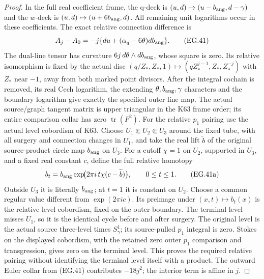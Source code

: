 \begin{proof}
In the full real coefficient frame,
the q-deck is
\((u,d)\mapsto(u-b_{\rm ang},d-\gamma)\)
and the \(w\)-deck is
\((u,d)\mapsto(u+6b_{\rm ang},d)\).
All remaining unit logarithms occur
in these coefficients. The exact
relative connection difference is
\[
 A_j-A_0=-j\{du+(\alpha_q-6\theta)
                                     db_{\rm ang}\}.
 \tag{EG.41}
\]
The dual-line tensor has curvature
\(6j\,d\theta\wedge db_{\rm ang}\),
whose square is zero. Its relative
isomorphism is fixed by the actual
disc
\((q/Z_*,Z_*,1)\mapsto(qZ_*^{j-1},Z_*,Z_*^{-j})\)
with \(Z_*\) near \(-1\), away
from both marked point divisors.
After the integral cochain is
removed, its real Cech logarithm,
the extending \(\theta,b_{\rm ang},
\gamma\) characters and the
boundary logarithm give exactly
the specified outer line map.
The actual source/graph tangent
matrix is upper triangular in
the K63 frame order; its entire
comparison collar has zero
\(\operatorname{tr}(F^2)\).
For the relative \(p_1\) pairing use the actual level
cobordism of K63. Choose \(U_1\Subset U_2\Subset U_3\)
around the fixed tube, with all surgery and connection changes
in \(U_1\), and take the real lift \(\widetilde b\) of the
original source-product circle map \(b_{\rm ang}\) on \(U_3\).
For a cutoff \(\chi=1\) on \(U_2\), supported in \(U_3\),
and a fixed real constant \(c\), define the full relative homotopy
\[
 b_t=b_{\rm ang}
       \exp\!\bigl(2\pi i\,t\chi(c-\widetilde b)\bigr),
 \qquad 0\le t\le1.
 \tag{EG.41a}
\]
Outside \(U_3\) it is literally \(b_{\rm ang}\); at \(t=1\)
it is constant on \(U_2\). Choose a common regular value different
from \(\exp(2\pi i c)\). Its preimage under
\((x,t)\mapsto b_t(x)\) is the relative level cobordism, fixed on
the outer boundary. The terminal level misses \(U_1\), so it is
the identical cycle before and after surgery. The original level
is the actual source three-level times \(S^1_\gamma\); its
source-pulled \(p_1\) integral is zero. Stokes on the displayed
cobordism, with the retained zero outer \(p_1\) comparison and
transgression, gives zero on the terminal level. This proves the
required relative pairing without identifying the terminal level
itself with a product.
The outward Euler collar from
(EG.41) contributes \(-18j^2\);
the interior term is affine in
\(j\).


\end{proof}
